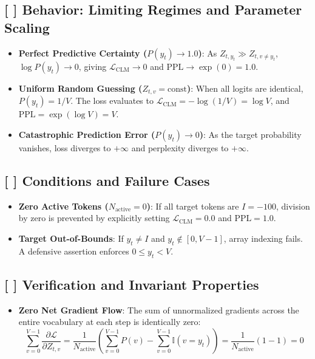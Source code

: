 \documentclass[11pt,a4paper]{article}
\theoremstyle{definition}
\begin{document}
\subsection{[ ] Behavior: Limiting Regimes and Parameter Scaling}
\begin{itemize}
    \item \textbf{Perfect Predictive Certainty ($P(y_t) \to 1.0$)}: As $Z_{t, y_t} \gg Z_{t, v \ne y_t}$, $\log P(y_t) \to 0$, giving $\mathcal{L}_{\text{CLM}} \to 0$ and $\text{PPL} \to \exp(0) = 1.0$.
    \item \textbf{Uniform Random Guessing ($Z_{t, v} = \text{const}$)}: When all logits are identical, $P(y_t) = 1/V$. The loss evaluates to $\mathcal{L}_{\text{CLM}} = -\log(1/V) = \log V$, and $\text{PPL} = \exp(\log V) = V$.
    \item \textbf{Catastrophic Prediction Error ($P(y_t) \to 0$)}: As the target probability vanishes, loss diverges to $+\infty$ and perplexity diverges to $+\infty$.
\end{itemize}

\subsection{[ ] Conditions and Failure Cases}
\begin{itemize}
    \item \textbf{Zero Active Tokens ($N_{\text{active}} = 0$)}: If all target tokens are $I = -100$, division by zero is prevented by explicitly setting $\mathcal{L}_{\text{CLM}} = 0.0$ and $\text{PPL} = 1.0$.
    \item \textbf{Target Out-of-Bounds}: If $y_t \ne I$ and $y_t \notin [0, V-1]$, array indexing fails. A defensive assertion enforces $0 \le y_t < V$.
\end{itemize}

\subsection{[ ] Verification and Invariant Properties}
\begin{itemize}
    \item \textbf{Zero Net Gradient Flow}: The sum of unnormalized gradients across the entire vocabulary at each step is identically zero:
    {\boldmath
    \begin{equation}
    \sum_{v=0}^{V-1} \frac{\partial \mathcal{L}}{\partial Z_{t, v}} = \frac{1}{N_{\text{active}}} \left( \sum_{v=0}^{V-1} P(v) - \sum_{v=0}^{V-1} \mathbb{I}(v = y_t) \right) = \frac{1}{N_{\text{active}}}(1 - 1) = 0
    \end{equation}
    }
\end{itemize}
\end{document}
